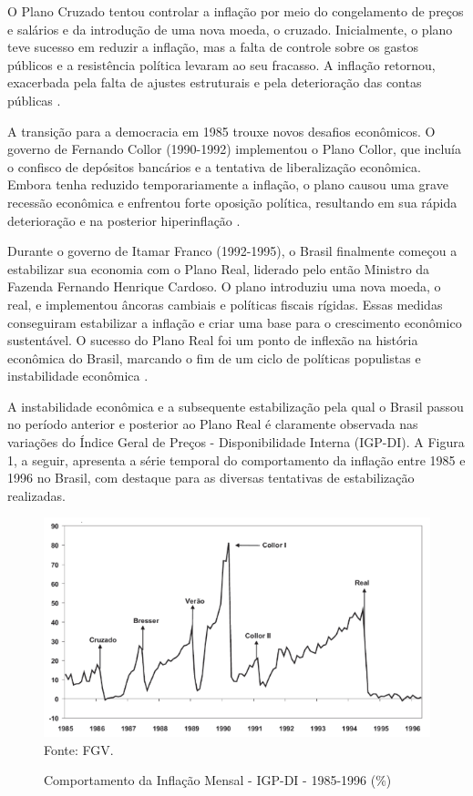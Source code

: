 \documentclass[12pt,oneside,a4paper,chapter=TITLE,english,brazil,sumario=abnt-6027-2012]{abntex2}
\begin{document}
O Plano Cruzado tentou controlar a inflação por meio do congelamento de preços e salários e da introdução de uma nova moeda, o cruzado. Inicialmente, o plano teve sucesso em reduzir a inflação, mas a falta de controle sobre os gastos públicos e a resistência política levaram ao seu fracasso. A inflação retornou, exacerbada pela falta de ajustes estruturais e pela deterioração das contas públicas \cite{fabiogiambiagi_1999_a}.

A transição para a democracia em 1985 trouxe novos desafios econômicos. O governo de Fernando Collor (1990-1992) implementou o Plano Collor, que incluía o confisco de depósitos bancários e a tentativa de liberalização econômica. Embora tenha reduzido temporariamente a inflação, o plano causou uma grave recessão econômica e enfrentou forte oposição política, resultando em sua rápida deterioração e na posterior hiperinflação \cite{lacerda_2010_economia}.

Durante o governo de Itamar Franco (1992-1995), o Brasil finalmente começou a estabilizar sua economia com o Plano Real, liderado pelo então Ministro da Fazenda Fernando Henrique Cardoso. O plano introduziu uma nova moeda, o real, e implementou âncoras cambiais e políticas fiscais rígidas. Essas medidas conseguiram estabilizar a inflação e criar uma base para o crescimento econômico sustentável. O sucesso do Plano Real foi um ponto de inflexão na história econômica do Brasil, marcando o fim de um ciclo de políticas populistas e instabilidade econômica \cite{lacerda_2010_economia}.

A instabilidade econômica e a subsequente estabilização pela qual o Brasil passou no período anterior e posterior ao Plano Real é claramente observada nas variações do Índice Geral de Preços - Disponibilidade Interna (IGP-DI). A Figura 1, a seguir, apresenta a série temporal do comportamento da inflação entre 1985 e 1996 no Brasil, com destaque para as diversas tentativas de estabilização realizadas.

\begin{figure}[H]
	
	\caption{Comportamento da Inflação Mensal - IGP-DI - 1985-1996 (\%)}
	
	\includegraphics[]{igp-di.png}\\
	
	\footnotesize Fonte: FGV.
	
\end{figure}
\end{document}
